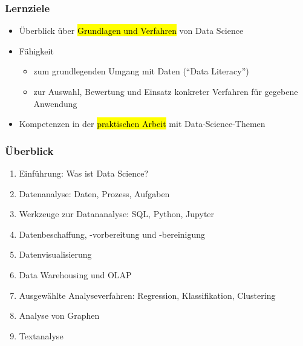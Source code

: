   
  \begin{frame}
  
    \frametitle{Lernziele}
  
  \begin{itemize}
  \item Überblick über \hl{Grundlagen und Verfahren} von Data Science
  \item Fähigkeit 
  \begin{itemize}
  \item zum grundlegenden Umgang mit Daten ("`Data Literacy"')
  \item zur Auswahl, Bewertung und Einsatz konkreter Verfahren für
    gegebene Anwendung 
  \end{itemize}
  \item Kompetenzen in der \hl{praktischen Arbeit} mit Data-Science-Themen 
\end{itemize}
  
  \end{frame}

  
  \begin{frame}
    \frametitle{Überblick}
  
    \begin{enumerate}
    \item<1-> Einführung: Was ist Data Science?
    \item<2-> Datenanalyse: Daten, Prozess, Aufgaben
    \item<3-> Werkzeuge zur Datananalyse: SQL, Python, Jupyter
    \item<4-> Datenbeschaffung, -vorbereitung und -bereinigung
    \item<5-> Datenvisualisierung
    \item<6-> Data Warehousing und OLAP
    \item<7-> Ausgewählte Analyseverfahren: Regression, Klassifikation, Clustering
    \item<8-> Analyse von Graphen
    \item<9-> Textanalyse
   \end{enumerate}
  
  \end{frame}

  
